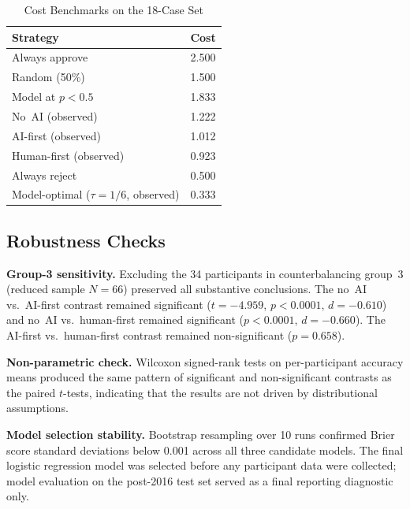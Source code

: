 \documentclass[conference]{IEEEtran}
\begin{document}
\begin{table}[H]
  \centering
  \caption{Cost Benchmarks on the 18-Case Set}
  \label{tab:bench}
  \begin{tabular}{lc}
    \toprule
    \textbf{Strategy}                      & \textbf{Cost} \\
    \midrule
    Always approve                          & 2.500 \\
    Random (50\%)                           & 1.500 \\
    Model at $p < 0.5$                      & 1.833 \\
    No~AI (observed)                        & 1.222 \\
    AI-first (observed)                     & 1.012 \\
    Human-first (observed)                  & 0.923 \\
    Always reject                           & 0.500 \\
    Model-optimal ($\tau = 1/6$, observed)  & 0.333 \\
    \bottomrule
  \end{tabular}
\end{table}

\subsection{Robustness Checks}

\textbf{Group-3 sensitivity.} Excluding the 34 participants in
counterbalancing group~3 (reduced sample $N = 66$) preserved all
substantive conclusions. The no~AI vs.\ AI-first contrast remained
significant ($t = -4.959$, $p < 0.0001$, $d = -0.610$) and no~AI vs.\
human-first remained significant ($p < 0.0001$, $d = -0.660$). The
AI-first vs.\ human-first contrast remained non-significant ($p =
0.658$).

\textbf{Non-parametric check.} Wilcoxon signed-rank tests on
per-participant accuracy means produced the same pattern of significant
and non-significant contrasts as the paired $t$-tests, indicating that
the results are not driven by distributional assumptions.

\textbf{Model selection stability.} Bootstrap resampling over 10 runs
confirmed Brier score standard deviations below 0.001 across all three
candidate models. The final logistic regression model was selected before
any participant data were collected; model evaluation on the post-2016
test set served as a final reporting diagnostic only.
\end{document}
